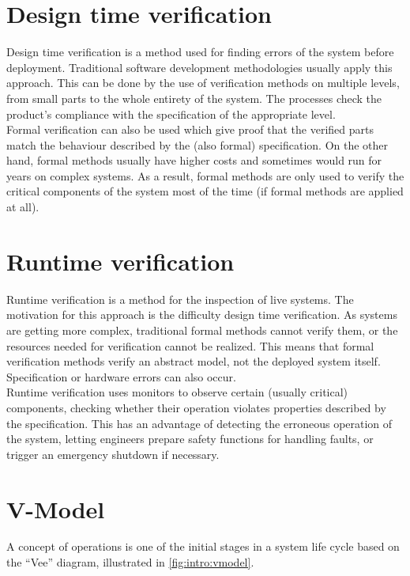 \section*{Design time verification}

Design time verification is a method used for finding errors of the system before deployment. Traditional software development methodologies usually apply this approach. This can be done by the use of verification methods on multiple levels, from small parts to the whole entirety of the system. The processes check the product’s compliance with the specification of the appropriate level.\\
Formal verification can also be used which give proof that the verified parts match the behaviour described by the (also formal) specification. On the other hand, formal methods usually have higher costs and sometimes would run for years on complex systems. As a result, formal methods are only used to verify the critical components of the system most of the time (if formal methods are applied at all).

\section*{Runtime verification}

Runtime verification is a method for the inspection of live systems.  The motivation for this approach is the difficulty design time verification. As systems are getting more complex, traditional formal methods cannot verify them, or the resources needed for verification cannot be realized. This means that formal verification methods verify an abstract model, not the deployed system itself. Specification or hardware errors can also occur.\\
Runtime verification uses monitors to observe certain (usually critical) components, checking whether their operation violates properties described by the specification. This has an advantage of detecting the erroneous operation of the system, letting engineers prepare safety functions for handling faults, or trigger an emergency shutdown if necessary.

\section*{V-Model}

A concept of operations is one of the initial stages in a system life cycle based on the “Vee” diagram, illustrated in \cref{fig:intro:vmodel}.

